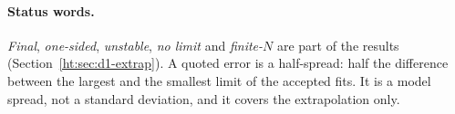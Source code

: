 \paragraph{Status words.} \emph{Final}, \emph{one-sided}, \emph{unstable}, \emph{no limit} and \emph{finite-$N$}
are part of the results (Section~\ref{ht:sec:d1-extrap}). A quoted error is a half-spread: half the difference between
the largest and the smallest limit of the accepted fits. It is a model spread, not a standard deviation, and it
covers the extrapolation only.
